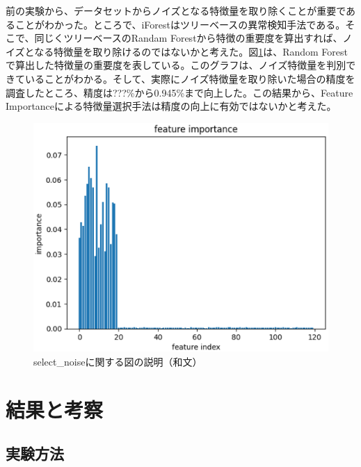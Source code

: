 \documentclass{css}
\begin{document}
前の実験から、データセットからノイズとなる特徴量を取り除くことが重要であることがわかった。ところで、iForestはツリーベースの異常検知手法である。そこで、同じくツリーベースのRandam Forestから特徴の重要度を算出すれば、ノイズとなる特徴量を取り除けるのではないかと考えた。図\ref{fig:select_noise}は、Random Forestで算出した特徴量の重要度を表している。このグラフは、ノイズ特徴量を判別できていることがわかる。そして、実際にノイズ特徴量を取り除いた場合の精度を調査したところ、精度は???\%から0.945\%まで向上した。この結果から、Feature Importanceによる特徴量選択手法は精度の向上に有効ではないかと考えた。

\begin{figure}[tb]
    \centering
    \includegraphics[width=\linewidth]{pictures/eps/select_noise.eps}
    \caption{select\_noiseに関する図の説明（和文）}
    \label{fig:select_noise}
\end{figure}

\section{結果と考察}

\subsection{実験方法}
\end{document}
